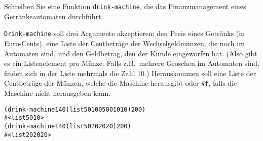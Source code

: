 \begin{aufgabe}\label{ex:coke-finances}
  Schreiben Sie eine Funktion \texttt{drink-machine}, die das
  Finanzmanagement eines Getränkeautomaten durchführt.
  
  \texttt{Drink-machine} soll drei Argumente akzeptieren: den Preis eines
  Getränks (in Euro-Cents), eine Liste der Centbeträge der
  Wechselgeldmünzen, die noch im Automaten sind, und den Geldbetrag,
  den der Kunde eingeworfen hat.  (Also gibt es ein Listenelement pro
  Münze. Falls z.B.\ mehrere Groschen im Automaten sind, finden sich
  in der Liste mehrmals die Zahl 10.)  Herauskommen soll eine Liste
  der Centbeträge der Münzen, welche die Maschine herausgibt oder
  \verb|#f|, falls die Maschine nicht herausgeben kann.
\begin{alltt}
(drink-machine 140 (list 50 100 500 10 10) 200)
\evalsto{} #<list 50 10>
(drink-machine 140 (list 50 20 20 20) 200)
\evalsto{} #<list 20 20 20>
\end{alltt}
\end{aufgabe}

